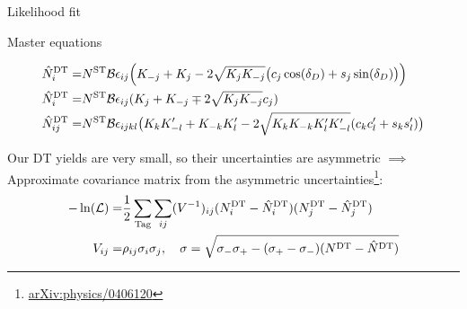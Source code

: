 \documentclass{beamer}
\begin{document}
\begin{frame}{Likelihood fit}
  \begin{block}{Master equations}
    \begin{center}
      \vspace{-0.5cm}
      \begin{align*}
        \hat{N}^{\rm DT}_i =& N^{\rm ST}\mathcal{B}\epsilon_{ij}\Big(K_{-j} + K_j - 2\sqrt{K_jK_{-j}}\big(c_j\cos(\delta_D) + s_j\sin(\delta_D)\big)\Big) \\
        \hat{N}^{\rm DT}_i =& N^{\rm ST}\mathcal{B}\epsilon_{ij}(K_j + K_{-j} \mp 2\sqrt{K_jK_{-j}}c_j) \\
        \hat{N}^{\rm DT}_{ij} =& N^{\rm ST}\mathcal{B}\epsilon_{ijkl}\big(K_{k}K_{-l}^\prime + K_{-k}K_{l}^\prime - 2\sqrt{K_{k}K_{-k}K_{l}^\prime K_{-l}^\prime}(c_{k}c_{l}^\prime + s_{k}s_{l}^\prime)\big)
      \end{align*}
    \end{center}
  \end{block}
  \vspace{0.5cm}
  \begin{center}
    Our DT yields are very small, so their uncertainties are asymmetric $\implies$\\
    Approximate covariance matrix from the asymmetric uncertainties\footnote{\href{https://arxiv.org/abs/physics/0406120}{arXiv:physics/0406120}}:
    \begin{align*}
      -\ln(\mathcal{L}) =& \frac{1}{2}\sum_{\rm Tag}\sum_{ij}(V^{-1})_{ij}(N^{\rm DT}_i - \hat{N}^{\rm DT}_i)(N^{\rm DT}_j - \hat{N}^{\rm DT}_j) \\
      V_{ij} =& \rho_{ij}\sigma_i\sigma_j, \quad \sigma = \sqrt{\sigma_-\sigma_+ - (\sigma_+ - \sigma_-)(N^{\rm DT} - \hat{N}^{\rm DT})}
    \end{align*}
  \end{center}
\end{frame}
\end{document}
